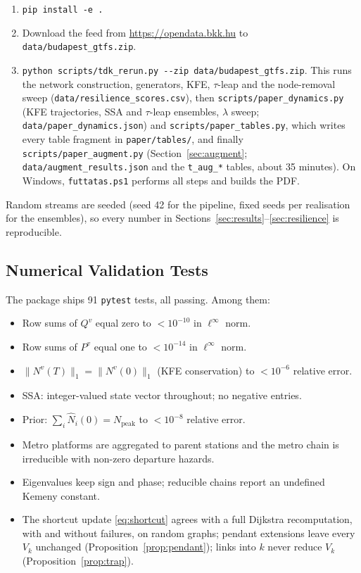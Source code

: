 \documentclass[12pt,a4paper]{article}
\theoremstyle{plain}
\theoremstyle{definition}
\theoremstyle{remark}
\begin{document}
\begin{enumerate}
  \item \texttt{pip install -e .}
  \item Download the feed from \url{https://opendata.bkk.hu} to
    \texttt{data/budapest\_gtfs.zip}.
  \item \texttt{python scripts/tdk\_rerun.py -{}-zip data/budapest\_gtfs.zip}.
    This runs the network construction, generators, KFE, $\tau$-leap and the
    node-removal sweep (\texttt{data/resilience\_scores.csv}), then
    \texttt{scripts/paper\_dynamics.py} (KFE trajectories, SSA and $\tau$-leap
    ensembles, $\lambda$ sweep; \texttt{data/paper\_dynamics.json}) and
    \texttt{scripts/paper\_tables.py}, which writes every table fragment in
    \texttt{paper/tables/}, and finally \texttt{scripts/paper\_augment.py}
    (Section~\ref{sec:augment}; \texttt{data/augment\_results.json} and the
    \texttt{t\_aug\_*} tables, about 35 minutes).  On Windows, \texttt{futtatas.ps1} performs all
    steps and builds the PDF.
\end{enumerate}
Random streams are seeded (seed 42 for the pipeline, fixed seeds per
realisation for the ensembles), so every number in
Sections~\ref{sec:results}--\ref{sec:resilience} is reproducible.


\subsection{Numerical Validation Tests}
\label{app:tests}

The package ships 91 \texttt{pytest} tests, all passing.  Among them:
\begin{itemize}
  \item Row sums of $Q^v$ equal zero to $<10^{-10}$ in $\ell^\infty$ norm.
  \item Row sums of $P^v$ equal one to $<10^{-14}$ in $\ell^\infty$ norm.
  \item $\|N^v(T)\|_1=\|N^v(0)\|_1$ (KFE conservation) to $<10^{-6}$ relative error.
  \item SSA: integer-valued state vector throughout; no negative entries.
  \item Prior: $\sum_i\hat{N}_i(0)=N_{\mathrm{peak}}$ to $<10^{-8}$ relative error.
  \item Metro platforms are aggregated to parent stations and the metro chain
    is irreducible with non-zero departure hazards.
  \item Eigenvalues keep sign and phase; reducible chains report an undefined
    Kemeny constant.
  \item The shortcut update \eqref{eq:shortcut} agrees with a full Dijkstra
    recomputation, with and without failures, on random graphs; pendant
    extensions leave every $V_k$ unchanged (Proposition~\ref{prop:pendant});
    links into $k$ never reduce $V_k$ (Proposition~\ref{prop:trap}).
\end{itemize}
\end{document}
